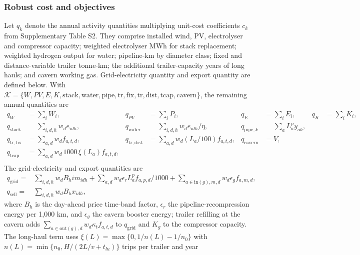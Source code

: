 \subsubsection{Robust cost and objectives}
Let $q_k$ denote the annual activity quantities multiplying unit-cost
coefficients $c_k$ from Supplementary Table S2. They comprise installed wind,
PV, electrolyser and compressor capacity; weighted electrolyser MWh for stack
replacement; weighted hydrogen output for water; pipeline-km by diameter class; fixed and
distance-variable trailer tonne-km; the additional trailer-capacity years of long hauls; and cavern
working gas. Grid-electricity
quantity and export quantity are defined below. With $\mathcal K=\{W,PV,E,K,
\mathrm{stack},\mathrm{water},\mathrm{pipe},\mathrm{tr,fix},\mathrm{tr,dist},\mathrm{tcap},
\mathrm{cavern}\}$, the remaining annual quantities are
\begin{equation}
\begin{aligned}
q_W&=\sum_iW_i, & q_{PV}&=\sum_iP_i, & q_E&=\sum_iE_i, & q_K&=\sum_iK_i,\\
q_{\mathrm{stack}}&=\sum_{i,d,h}w_de_{idh}, &
q_{\mathrm{water}}&=\sum_{i,d,h}w_de_{idh}/\eta, &
q_{\mathrm{pipe},k}&=\sum_aL_a^py_{ak},\\
q_{\mathrm{tr,fix}}&=\sum_{a,d}w_df_{a,t,d}, &
q_{\mathrm{tr,dist}}&=\sum_{a,d}w_d(L_a/100)f_{a,t,d}, &
q_{\mathrm{cavern}}&=V,\\
q_{\mathrm{tcap}}&=\sum_{a,d}w_d\,1000\,\xi(L_a)f_{a,t,d}, & & & & \\
\end{aligned}
\label{eq:s5_activity_quantities}
\end{equation}
The grid-electricity and export quantities are
\begin{equation}
\begin{aligned}
q_{\mathrm{grid}}={}&\sum_{i,d,h}w_dB_h im_{idh}
+\sum_{a,d}w_d\epsilon_r L^p_a f_{a,p,d}/1000
+\sum_{a\in\mathrm{in}(g),m,d}w_d\epsilon_g f_{a,m,d},\\
q_{\mathrm{sell}}={}&\sum_{i,d,h}w_dB_hx_{idh},
\end{aligned}
\label{eq:s5_grid_quantities}
\end{equation}
where $B_h$ is the day-ahead price time-band factor, $\epsilon_r$ the
pipeline-recompression energy per 1,000 km, and $\epsilon_g$ the cavern
booster energy; trailer refilling at the cavern adds $\sum_{a\in\mathrm{out}(g),d}w_d\kappa_tf_{a,t,d}$ to
$q_{\mathrm{grid}}$ and $K_g$ to the compressor capacity. The long-haul term uses
$\xi(L)=\max\{0,1/n(L)-1/n_0\}$ with $n(L)=\min\{n_0,H/(2L/v+t_{lu})\}$ trips per trailer and year
